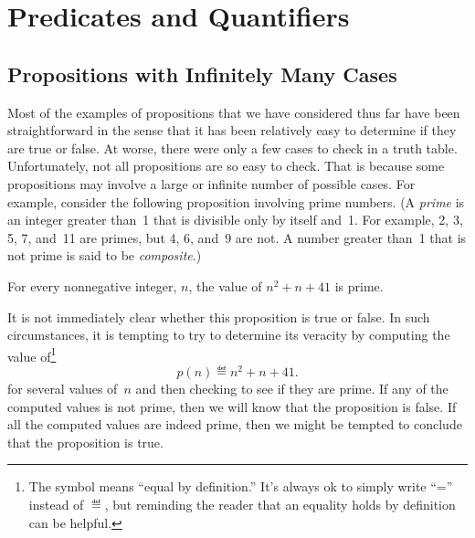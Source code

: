 \begin{problems}
\classproblems
{}

\homeworkproblems
{}

\end{problems}

\begin{problems}
\classproblems
{}

\end{problems}


\section{Predicates and Quantifiers}\label{pred_sec}

\subsection{Propositions with Infinitely Many Cases}

Most of the examples of propositions that we have considered thus far
have been straightforward in the sense that it has been relatively easy to
determine if they are true or false.  At worse, there were only a few
cases to check in a truth table.  Unfortunately, not all propositions
are so easy to check.  That is because some propositions may involve a
large or infinite number of possible cases.  For example, consider the
following proposition involving prime numbers.  (A \emph{prime} is an
integer greater than~1 that is divisible only by itself and~1.  For
example, 2, 3, 5, 7, and~11 are primes, but 4, 6, and~9 are not.  A
number greater than~1 that is not prime is said to be
\emph{composite}.)
\begin{proposition}\label{41form}
For every nonnegative integer, $n$, the value of $n^2 + n + 41$ is prime.
\end{proposition}
It is not immediately clear whether this proposition is true or
false.  In such circumstances, it is tempting to try to determine its
veracity by computing the value of\footnote{The symbol \term{$\eqdef$} means
 ``equal by definition.''  It's always ok to simply write ``='' instead of
 $\eqdef$, but reminding the reader that an equality holds by definition
 can be helpful.}
\begin{equation}\label{pn41}
p(n) \eqdef  n^2 + n + 41.
\end{equation}
for several values of~$n$ and then checking to see if they are prime.
If any of the computed values is not prime, then we will know that the
proposition is false.  If all the computed values are indeed prime,
then we might be tempted to conclude that the proposition is true.

